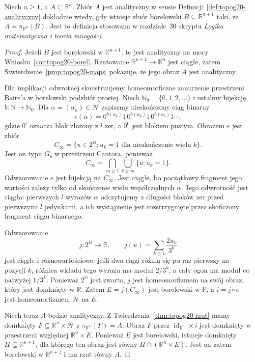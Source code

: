 \begin{stwierdzenie}
\label{prop:topog20-borel-projection}
Niech \(n\ge1\), a \(A\subseteq\mathbb R^n\).
Zbiór \(A\) jest analityczny
w sensie Definicji~\ref{def:topog20-analityczny}
dokładnie wtedy, gdy
istnieje zbiór borelowski
\(B\subseteq\mathbb R^{n+1}\)
taki, że \(A=\pi_{\mathbb R^n}(B)\).
Jest to definicja stosowana
w rozdziale~30 skryptu
\emph{Logika matematyczna i teoria mnogości}.
\end{stwierdzenie}
\begin{proof}
Jeżeli \(B\) jest borelowski
w \(\mathbb R^{n+1}\),
to jest analityczny na mocy
Wniosku~\ref{cor:topog20-borel}.
Rzutowanie
\(\mathbb R^{n+1}\to\mathbb R^n\)
jest ciągłe, zatem
Stwierdzenie~\ref{prop:topog20-maps}
pokazuje, że jego obraz \(A\)
jest analityczny.

Dla implikacji odwrotnej
skonstruujemy homeomorficzne
zanurzenie przestrzeni Baire'a
w borelowski podzbiór prostej.
Niech \(\mathbb N_0=\{0,1,2,\ldots\}\)
i ustalmy bijekcję
\(b\colon\mathbb N\to\mathbb N_0\).
Dla \(\alpha=(\alpha_k)\in\mathcal N\)
zapiszmy nieskończony ciąg binarny
\[
 e(\alpha)=
 0^{b(\alpha_1)}1\,
 0^{b(\alpha_2)}1\,
 0^{b(\alpha_3)}1\cdots,
\]
gdzie \(0^l\) oznacza blok
złożony z \(l\) zer,
a \(0^0\) jest blokiem pustym.
Obrazem \(e\) jest zbiór
\[
 C_\infty=\{u\in2^{\mathbb N}:
             u_k=1\text{ dla
             nieskończenie wielu }k\}.
\]
Jest on typu \(G_\delta\)
w przestrzeni Cantora, ponieważ
\[
 C_\infty=
 \bigcap_{m\ge1}\bigcup_{k\ge m}
                  \{u:u_k=1\}.
\]
Odwzorowanie \(e\) jest bijekcją
na \(C_\infty\).
Jest ciągłe, bo początkowy
fragment jego wartości
zależy tylko od skończenie
wielu współrzędnych \(\alpha\).
Jego odwrotność jest ciągła:
pierwszych \(l\) wyrazów
\(\alpha\) odczytujemy z długości
bloków zer przed pierwszymi
\(l\) jedynkami, a ich wystąpienie
jest rozstrzygnięte przez
skończony fragment ciągu binarnego.

Odwzorowanie
\[
 j\colon2^{\mathbb N}\longrightarrow
           \mathbb R,\qquad
 j(u)=\sum_{k\ge1}\frac{2u_k}{3^k}
\]
jest ciągłe i różnowartościowe:
jeśli dwa ciągi różnią się
po raz pierwszy na pozycji \(k\),
różnica wkładu tego wyrazu
ma moduł \(2/3^k\),
a cały ogon ma moduł
co najwyżej \(1/3^k\).
Ponieważ \(2^{\mathbb N}\)
jest zwarta, \(j\) jest
homeomorfizmem na swój obraz,
który jest domknięty w
\(\mathbb R\).
Zatem \(E=j(C_\infty)\)
jest borelowski w \(\mathbb R\),
a \(i=j\circ e\)
jest homeomorfizmem
\(\mathcal N\) na \(E\).

Niech teraz \(A\) będzie analityczny.
Z Twierdzenia~\ref{thm:topog20-rzut}
mamy domknięty
\(F\subseteq\mathbb R^n\times\mathcal N\)
z \(\pi_{\mathbb R^n}(F)=A\).
Obraz \(F\) przez
\(\operatorname{id}_{\mathbb R^n}\times i\)
jest domknięty w przestrzeni
względnej \(\mathbb R^n\times E\).
Ponieważ \(E\) jest borelowski,
istnieje domknięty
\(H\subseteq\mathbb R^{n+1}\),
dla którego ten obraz
jest równy
\(H\cap(\mathbb R^n\times E)\).
Jest on zatem borelowski
w \(\mathbb R^{n+1}\)
i ma rzut równy \(A\).
\end{proof}

